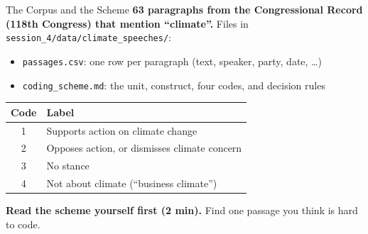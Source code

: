 \documentclass[aspectratio=169, 11pt]{beamer}
\begin{document}
\begin{frame}{The Corpus and the Scheme}
  \textbf{63 paragraphs from the Congressional Record (118th Congress) that mention ``climate''.} Files in \texttt{session\_4/data/climate\_speeches/}:

  \vspace{0.3em}
  \begin{itemize}\small
    \item \texttt{passages.csv}: one row per paragraph (text, speaker, party, date, \ldots)
    \item \texttt{coding\_scheme.md}: the unit, construct, four codes, and decision rules
  \end{itemize}

  \vspace{0.4em}
  \begin{tabular}{@{}cl@{}}
    \toprule
    \textbf{Code} & \textbf{Label} \\
    \midrule
    1 & Supports action on climate change \\
    2 & Opposes action, or dismisses climate concern \\
    3 & No stance \\
    4 & Not about climate (``business climate'') \\
    \bottomrule
  \end{tabular}

  \vspace{0.5em}
  {\small \textbf{Read the scheme yourself first (2 min).} Find one passage you think is hard to code.}
\end{frame}
\end{document}
